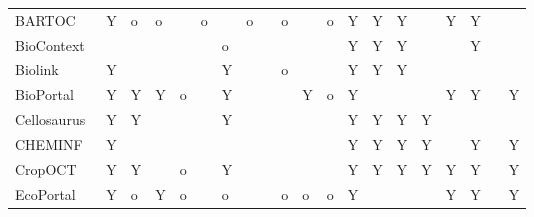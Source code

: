 \begin{table}
\begin{tabular}{llllllllllllllllllll}
                                 BARTOC &              Y &        o &     o &            &          o &          &              o &               &       o &         &       o &                          Y &         Y &                 Y &                    &             Y &               Y &                &               \\
           BioContext~\cite{biocontext} &                &          &       &            &            &        o &                &               &         &         &         &                          Y &         Y &                 Y &                    &               &               Y &                &               \\
                Biolink~\cite{Unni2022} &              Y &          &       &            &            &        Y &                &               &       o &         &         &                          Y &         Y &                 Y &                    &               &                 &                &               \\
           BioPortal~\cite{Whetzel2011} &              Y &        Y &     Y &          o &            &        Y &                &               &         &       Y &       o &                          Y &           &                   &                    &             Y &               Y &                &             Y \\
         Cellosaurus~\cite{Bairoch2018} &              Y &        Y &       &            &            &        Y &                &               &         &         &         &                          Y &         Y &                 Y &                  Y &               &                 &                &               \\
            CHEMINF~\cite{Hastings2011} &              Y &          &       &            &            &          &                &               &         &         &         &                          Y &         Y &                 Y &                  Y &               &               Y &                &             Y \\
              CropOCT~\cite{Arnaud2020} &              Y &        Y &       &          o &            &        Y &                &               &         &         &         &                          Y &         Y &                 Y &                  Y &             Y &               Y &                &             Y \\
      EcoPortal~\cite{Kechagioglou2021} &              Y &        o &     Y &          o &            &        o &                &               &       o &       o &       o &                          Y &           &                   &                    &             Y &               Y &                &             Y \\

\end{tabular}
\end{table}
